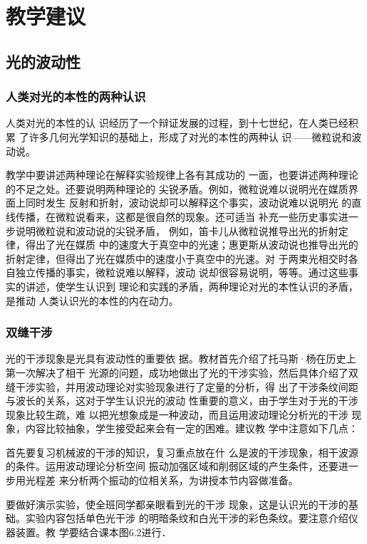 \section{教学建议}
\subsection{光的波动性}
\subsubsection{人类对光的本性的两种认识}

人类对光的本性的认
识经历了一个辩证发展的过程，到十七世纪，在人类已经积累
了许多几何光学知识的基础上，形成了对光的本性的两种认
识——微粒说和波动说。

教学中要讲述两种理论在解释实验规律上各有其成功的
一面，也要讲述两种理论的不足之处。还要说明两种理论的
尖锐矛盾。例如，微粒说难以说明光在媒质界面上同时发生
反射和折射，波动说却可以解释这个事实，波动说难以说明光
的直线传播，在微粒说看来，这都是很自然的现象。还可适当
补充一些历史事实进一步说明微粒说和波动说的尖锐矛盾，
例如，笛卡儿从微粒说推导出光的折射定律，得出了光在媒质
中的速度大于真空中的光速；惠更斯从波动说也推导出光的
折射定律，但得出了光在媒质中的速度小于真空中的光速。对
于两束光相交时各自独立传播的事实，微粒说难以解释，波动
说却很容易说明，等等。通过这些事实的讲述，使学生认识到
理论和实践的矛盾，两种理论对光的本性认识的矛盾，是推动
人类认识光的本性的内在动力。

\subsubsection{双缝干涉}

光的干涉现象是光具有波动性的重要依
据。教材首先介绍了托马斯·杨在历史上第一次解决了相干
光源的问题，成功地做出了光的干涉实验，然后具体介绍了双
缝干涉实验，并用波动理论对实验现象进行了定量的分析，得
出了干涉条纹间距与波长的关系，这对于学生认识光的波动
性重要的意义，由于学生对于光的干涉现象比较生疏，难
以把光想象成是一种波动，而且运用波动理论分析光的干涉
现象，内容比较抽象，学生接受起来会有一定的困难。建议教
学中注意如下几点：

首先要复习机械波的干涉的知识，复习重点放在什
么是波的干涉现象，相干波源的条件。运用波动理论分析空间
振动加强区域和削弱区域的产生条件，还要进一步用光程差
来分析两个振动的位相关系，为讲授本节内容做准备。

要做好演示实验，使全班同学都亲眼看到光的干涉
现象，这是认识光的干涉的基础。实验内容包括单色光干涉
的明暗条纹和白光干涉的彩色条纹。要注意介绍仪器装置。教
学要结合课本图6.2进行．

